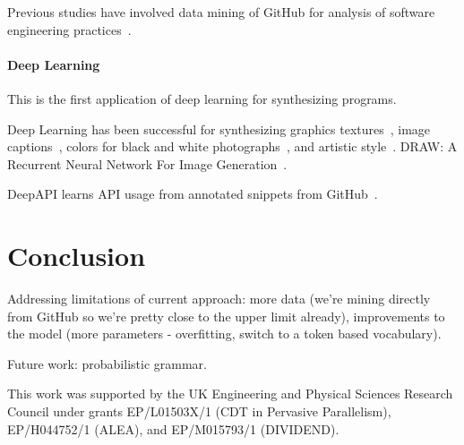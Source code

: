 \documentclass[preprint,nonatbib,10pt,nocopyrightspace]{sigplanconf}
\begin{document}
Previous studies have involved data mining of GitHub for analysis of
software engineering
practices~\cite{Wu2014,Guzman2014,Baishakhi2014a,Vasilescu2015}.


\paragraph{Deep Learning} This is the first application of deep
learning for synthesizing programs.

Deep Learning has been successful for synthesizing graphics
textures~\cite{Gatys2015a}, image captions~\cite{Vinyals}, colors for
black and white photographs~\cite{Zhang2016}, and artistic
style~\cite{Gatys2015}. DRAW: A Recurrent Neural Network For Image
Generation~\cite{Gregor2014}.


DeepAPI learns API usage from annotated snippets from
GitHub~\cite{Zhang2015a}.


\section{Conclusion}\label{sec:conclusion}

Addressing limitations of current approach: more data (we're mining
directly from GitHub so we're pretty close to the upper limit
already), improvements to the model (more parameters - overfitting,
switch to a token based vocabulary).

Future work: probabilistic grammar.


\acks

This work was supported by the UK Engineering and Physical Sciences
Research Council under grants EP/L01503X/1 (CDT in Pervasive
Parallelism), EP/H044752/1 (ALEA), and EP/M015793/1 (DIVIDEND).

\label{bibliography}
\printbibliography
\end{document}
